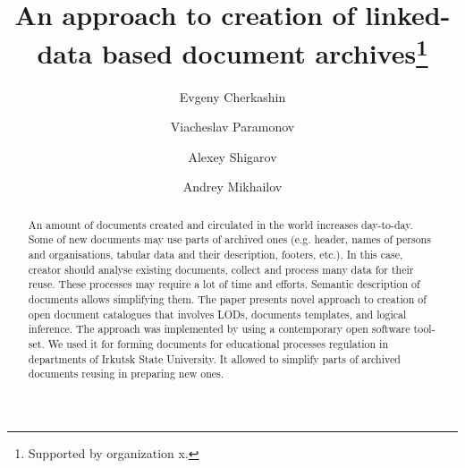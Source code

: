 \documentclass[12pt]{llncs}
\begin{document}
\title{An approach to creation of linked-data based document archives\thanks{Supported by organization x.}}
%
%
\author{Evgeny Cherkashin \and
Viacheslav Paramonov \and
Alexey Shigarov \and
Andrey Mikhailov}
%
%

%
\maketitle              %
%
\begin{abstract}
An amount of documents created and circulated in the world increases day-to-day. Some of new documents may use parts of archived ones (e.g. header, names of persons and organisations, tabular data and their description, footers, etc.). In this case, creator should analyse existing documents, collect and process many data for their reuse. These processes may require a lot of time and efforts. Semantic description of documents allows simplifying them. The paper presents novel approach to creation of open document catalogues that involves LODs, documents templates, and logical inference. The approach was implemented by using a contemporary open software tool-set. We used it for forming documents for educational processes regulation in departments of Irkutsk State University. It allowed to simplify parts of archived documents reusing in preparing new ones.


\end{abstract}


\end{document}
